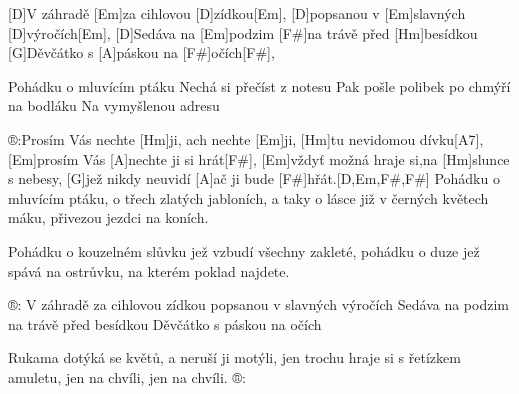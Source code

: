 
[D]V záhradě [Em]za cihlovou [D]zídkou[Em],
[D]popsanou v [Em]slavných [D]výročích[Em],
[D]Sedáva na [Em]podzim [F#]na trávě před [Hm]besídkou
[G]Děvčátko s [A]páskou na [F#]očích[F#],

Pohádku o mluvícím ptáku
Nechá si přečíst z notesu
Pak pošle polibek po chmýří na bodláku
Na vymyšlenou adresu

®:Prosím Vás nechte [Hm]ji, ach nechte [Em]ji,
[Hm]tu nevidomou dívku[A7],
[Em]prosím Vás [A]nechte ji si hrát[F#],
[Em]vždyť možná hraje si,na [Hm]slunce s nebesy,
[G]jež nikdy neuvidí [A]ač ji bude [F#]hřát.[D,Em,F#,F#]
\slpc
Pohádku o mluvícím ptáku,
o třech zlatých jabloních,
a taky o lásce již v černých květech máku,
přivezou jezdci na koních.

Pohádku o kouzelném slůvku
jež vzbudí všechny zakleté,
pohádku o duze jež spává na ostrůvku,
na kterém poklad najdete.

®:
V záhradě za cihlovou zídkou
popsanou v slavných výročích
Sedáva na podzim na trávě před besídkou
Děvčátko s páskou na očích

Rukama dotýká se květů,
a neruší ji motýli,
jen trochu hraje si s řetízkem amuletu,
jen na chvíli, jen na chvíli. ®:
\vfill\null